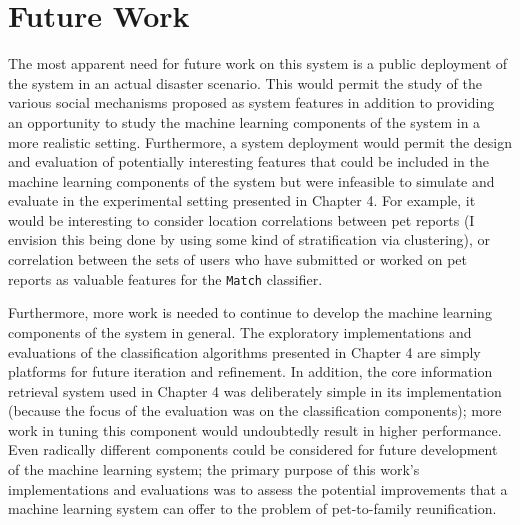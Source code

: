 \section {Future Work}

The most apparent need for future work on this system is a public deployment of the system in an actual disaster scenario.  This would permit the study of the various social mechanisms proposed as system features in addition to providing an opportunity to study the machine learning components of the system in a more realistic setting.  Furthermore, a system deployment would permit the design and evaluation of potentially interesting features that could be included in the machine learning components of the system but were infeasible to simulate and evaluate in the experimental setting presented in Chapter 4.  For example, it would be interesting to consider location correlations between pet reports (I envision this being done by using some kind of stratification via clustering), or correlation between the sets of users who have submitted or worked on pet reports as valuable features for the {\tt Match} classifier.  

Furthermore, more work is needed to continue to develop the machine learning components of the system in general.  The exploratory implementations and evaluations of the classification algorithms presented in Chapter 4 are simply platforms for future iteration and refinement.  In addition, the core information retrieval system used in Chapter 4 was deliberately simple in its implementation (because the focus of the evaluation was on the classification components); more work in tuning this component would undoubtedly result in higher performance.  Even radically different components could be considered for future development of the machine learning system; the primary purpose of this work's implementations and evaluations was to assess the potential improvements that a machine learning system can offer to the problem of pet-to-family reunification.
